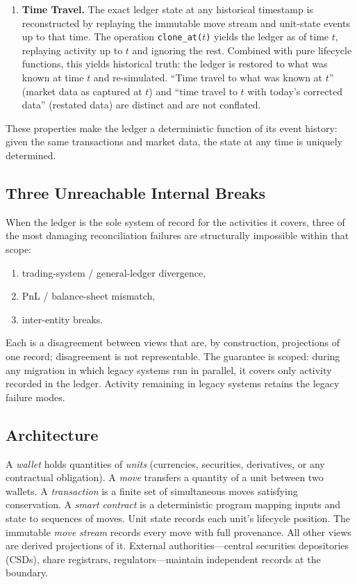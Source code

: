 \begin{enumerate}
\item \textbf{Time Travel.} The exact ledger state at any historical timestamp is reconstructed by replaying the immutable move stream and unit-state events up to that time. The operation \texttt{clone\_at($t$)} yields the ledger as of time $t$, replaying activity up to $t$ and ignoring the rest. Combined with pure lifecycle functions, this yields historical truth: the ledger is restored to what was known at time $t$ and re-simulated. ``Time travel to what was known at $t$'' (market data as captured at $t$) and ``time travel to $t$ with today's corrected data'' (restated data) are distinct and are not conflated.
\end{enumerate}

These properties make the ledger a deterministic function of its event history: given the same transactions and market data, the state at any time is uniquely determined.

\subsection{Three Unreachable Internal Breaks}

When the ledger is the sole system of record for the activities it covers, three of the most damaging reconciliation failures are structurally impossible within that scope:

\begin{enumerate}[nosep]
\item trading-system / general-ledger divergence,
\item PnL / balance-sheet mismatch,
\item inter-entity breaks.
\end{enumerate}

\noindent Each is a disagreement between views that are, by construction, projections of one record; disagreement is not representable. The guarantee is scoped: during any migration in which legacy systems run in parallel, it covers only activity recorded in the ledger. Activity remaining in legacy systems retains the legacy failure modes.

\subsection{Architecture}

A \textit{wallet} holds quantities of \textit{units} (currencies, securities, derivatives, or any contractual obligation). A \textit{move} transfers a quantity of a unit between two wallets. A \textit{transaction} is a finite set of simultaneous moves satisfying conservation. A \textit{smart contract} is a deterministic program mapping inputs and state to sequences of moves. Unit state records each unit's lifecycle position. The immutable \textit{move stream} records every move with full provenance. All other views are derived projections of it. External authorities---central securities depositories (CSDs), share registrars, regulators---maintain independent records at the boundary.

